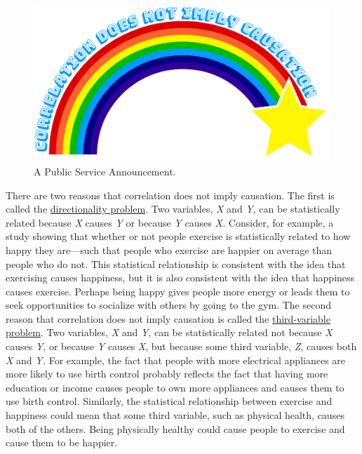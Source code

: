 \documentclass[
]{krantz}
\begin{document}
\begin{figure}

{\centering \includegraphics[width=0.9\linewidth]{images/getting-started/correlationdoesnotimplycausation} 

}

\caption{A Public Service Announcement.}\label{fig:correlationdoesnotimplycausation}
\end{figure}

There are two reasons that correlation does not imply causation. The first is called the \protect\hyperlink{directionality-problem}{directionality problem}. Two variables, \emph{X} and \emph{Y}, can be statistically related because \emph{X} causes \emph{Y} or because \emph{Y} causes \emph{X.} Consider, for example, a study showing that whether or not people exercise is statistically related to how happy they are---such that people who exercise are happier on average than people who do not. This statistical relationship is consistent with the idea that exercising causes happiness, but it is also consistent with the idea that happiness causes exercise. Perhaps being happy gives people more energy or leads them to seek opportunities to socialize with others by going to the gym. The second reason that correlation does not imply causation is called the \protect\hyperlink{third-variable-problem}{third-variable problem}. Two variables, \emph{X} and \emph{Y}, can be statistically related not because \emph{X} causes \emph{Y}, or because \emph{Y} causes \emph{X}, but because some third variable, \emph{Z}, causes both \emph{X} and \emph{Y.} For example, the fact that people with more electrical appliances are more likely to use birth control probably reflects the fact that having more education or income causes people to own more appliances and causes them to use birth control. Similarly, the statistical relationship between exercise and happiness could mean that some third variable, such as physical health, causes both of the others. Being physically healthy could cause people to exercise and cause them to be happier.
\end{document}
